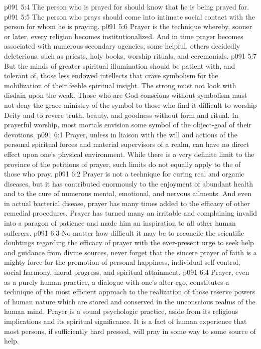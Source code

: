 \vs p091 5:4 \bibnobreakspace The person who is prayed for should know that he is being prayed for.
\vs p091 5:5 \bibnobreakspace The person who prays should come into intimate social contact with the person for whom he is praying.
\vs p091 5:6 \pc Prayer is the technique whereby, sooner or later, every religion becomes institutionalized. And in time prayer becomes associated with numerous secondary agencies, some helpful, others decidedly deleterious, such as priests, holy books, worship rituals, and ceremonials.
\vs p091 5:7 But the minds of greater spiritual illumination should be patient with, and tolerant of, those less endowed intellects that crave symbolism for the mobilization of their feeble spiritual insight. The strong must not look with disdain upon the weak. Those who are God\hyp{}conscious without symbolism must not deny the grace\hyp{}ministry of the symbol to those who find it difficult to worship Deity and to revere truth, beauty, and goodness without form and ritual. In prayerful worship, most mortals envision some symbol of the object\hyp{}goal of their devotions.
\vs p091 6:1 Prayer, unless in liaison with the will and actions of the personal spiritual forces and material supervisors of a realm, can have no direct effect upon one’s physical environment. While there is a very definite limit to the province of the petitions of prayer, such limits do not equally apply to the  of those who pray.
\vs p091 6:2 Prayer is not a technique for curing real and organic diseases, but it has contributed enormously to the enjoyment of abundant health and to the cure of numerous mental, emotional, and nervous ailments. And even in actual bacterial disease, prayer has many times added to the efficacy of other remedial procedures. Prayer has turned many an irritable and complaining invalid into a paragon of patience and made him an inspiration to all other human sufferers.
\vs p091 6:3 No matter how difficult it may be to reconcile the scientific doubtings regarding the efficacy of prayer with the ever\hyp{}present urge to seek help and guidance from divine sources, never forget that the sincere prayer of faith is a mighty force for the promotion of personal happiness, individual self\hyp{}control, social harmony, moral progress, and spiritual attainment.
\vs p091 6:4 Prayer, even as a purely human practice, a dialogue with one’s alter ego, constitutes a technique of the most efficient approach to the realization of those reserve powers of human nature which are stored and conserved in the unconscious realms of the human mind. Prayer is a sound psychologic practice, aside from its religious implications and its spiritual significance. It is a fact of human experience that most persons, if sufficiently hard pressed, will pray in some way to some source of help.
